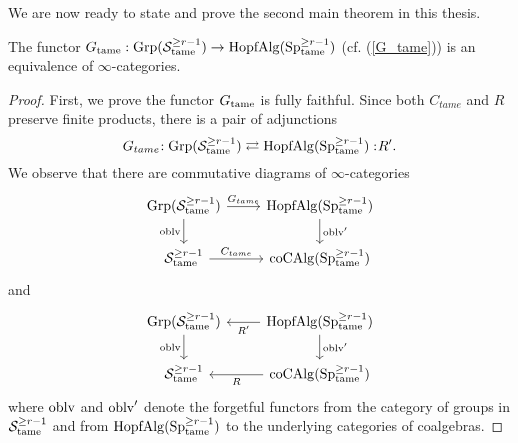 We are now ready to state and prove the second main theorem in this thesis.
\begin{theorem}
	The functor $G_{\operatorname{\operatorname{tame}}}: \operatorname{Grp}({\mathcal{S}}^{\geq r-1}_{\operatorname{\operatorname{tame}}})\to \operatorname{HopfAlg}(\operatorname{Sp}^{\geq r-1}_{\operatorname{\operatorname{tame}}})$ (cf. (\ref{G_tame})) is an equivalence of $\infty$-categories.
\end{theorem}
\begin{proof}
First, we prove the functor $G_{\operatorname{\operatorname{tame}}}$ is fully faithful.
Since both $C_{tame}$ and $R$ preserve finite products, there is a pair of adjunctions
\begin{equation}
\label{adj on grps}
	G_{tame}\negmedspace: \operatorname{Grp}({\mathcal{S}}^{\geq r-1}_{\operatorname{\operatorname{tame}}})\rightleftarrows \operatorname{HopfAlg}(\operatorname{Sp}^{\geq r-1}_{\operatorname{\operatorname{tame}}}):\negmedspace R'.
\end{equation}
We observe that there are commutative diagrams of $\infty$-categories
\[
\begin{tikzcd}
	\Grp(\CS^{\geq r-1}_{\tame}) & \Hopfalgebra(\Sp^{\geq r-1}_{\tame})\\
	\CS^{\geq r-1}_{\tame}  & 
	\coCAlg(\Sp^{\geq r-1}_{\tame})
	\arrow[from=1-1, to= 1-2, "G_{tame}"]
	\arrow[from=1-1, to=2-1, "\oblv" left]
	\arrow[from=1-2, to=2-2, "\oblv'" ]
	\arrow[from=2-1, to= 2-2, "C_{tame}"]
\end{tikzcd}
\]
and 
\[
\begin{tikzcd}
	\Grp(\CS^{\geq r-1}_{\tame}) & \Hopfalgebra(\Sp^{\geq r-1}_{\tame})\\
	\CS^{\geq r-1}_{\tame}  & 
	\coCAlg(\Sp^{\geq r-1}_{\tame})
	\arrow[from=1-2, to= 1-1, "R'"]
	\arrow[from=1-1, to=2-1, "\oblv" left]
	\arrow[from=1-2, to=2-2, "\oblv'" ]
	\arrow[from=2-2, to= 2-1, "R"]
\end{tikzcd}
\]
where $\operatorname{oblv}$ and $\operatorname{oblv}'$ denote the forgetful functors from the category of groups in ${\mathcal{S}}^{\geq r-1}_{\operatorname{\operatorname{tame}}}$ and from $\operatorname{HopfAlg}(\operatorname{Sp}^{\geq r-1}_{\operatorname{\operatorname{tame}}})$ to the underlying categories of coalgebras.


\end{proof}

